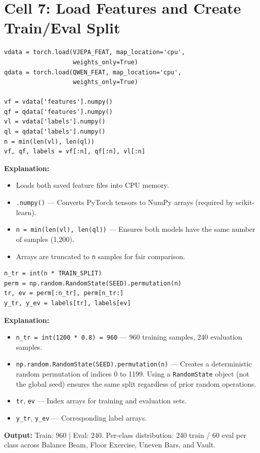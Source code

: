 \documentclass[a4paper, 12pt]{article}
\newenvironment{explanation}{%
  \par\smallskip
  \noindent\textcolor{blue!70!black}{\textbf{Explanation:}}\\
  \noindent
}{\par\medskip}
\begin{document}
\newpage
\section{Cell 7: Load Features and Create Train/Eval Split}

\begin{lstlisting}
vdata = torch.load(VJEPA_FEAT, map_location='cpu',
                   weights_only=True)
qdata = torch.load(QWEN_FEAT, map_location='cpu',
                   weights_only=True)

vf = vdata['features'].numpy()
qf = qdata['features'].numpy()
vl = vdata['labels'].numpy()
ql = qdata['labels'].numpy()
n = min(len(vl), len(ql))
vf, qf, labels = vf[:n], qf[:n], vl[:n]
\end{lstlisting}

\begin{explanation}
\begin{itemize}[nosep]
  \item Loads both saved feature files into CPU memory.
  \item \texttt{.numpy()} --- Converts PyTorch tensors to NumPy arrays (required by scikit-learn).
  \item \texttt{n = min(len(vl), len(ql))} --- Ensures both models have the same number of samples (1,200).
  \item Arrays are truncated to \texttt{n} samples for fair comparison.
\end{itemize}
\end{explanation}

\begin{lstlisting}
n_tr = int(n * TRAIN_SPLIT)
perm = np.random.RandomState(SEED).permutation(n)
tr, ev = perm[:n_tr], perm[n_tr:]
y_tr, y_ev = labels[tr], labels[ev]
\end{lstlisting}

\begin{explanation}
\begin{itemize}[nosep]
  \item \texttt{n\_tr = int(1200 * 0.8) = 960} --- 960 training samples, 240 evaluation samples.
  \item \texttt{np.random.RandomState(SEED).permutation(n)} --- Creates a deterministic random permutation of indices 0 to 1199. Using a \texttt{RandomState} object (not the global seed) ensures the same split regardless of prior random operations.
  \item \texttt{tr}, \texttt{ev} --- Index arrays for training and evaluation sets.
  \item \texttt{y\_tr}, \texttt{y\_ev} --- Corresponding label arrays.
\end{itemize}
\textbf{Output:} Train: 960 | Eval: 240. Per-class distribution: 240 train / 60 eval per class across Balance Beam, Floor Exercise, Uneven Bars, and Vault.
\end{explanation}
\end{document}
